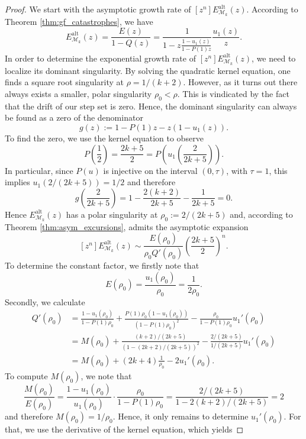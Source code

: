 \begin{proof}
  We start with the asymptotic growth rate of $[z^n]E_{\mathcal{M}_k}^\mathrm{alt}(z)$. 
  According to Theorem \ref{thm:gf_catastrophes}, we have 
  $$ 
    E_{\mathcal{M}_k}^\mathrm{alt}(z) = \frac{E(z)}{1 - Q(z)} = \frac{1}{1-z\frac{1-u_{1}(z)}{1-P(1)z}}\frac{u_{1}(z)}{z}.
  $$
  In order to determine the exponential growth rate of $[z^n]E_{\mathcal{M}_k}^\mathrm{alt}(z)$, we need to localize its dominant singularity.
  By solving the quadratic kernel equation, one finds a square root singularity  at $\rho = 1/(k+2)$.
  However, as it turns out there always exists a smaller, polar singularity $\rho_{0} < \rho$. This is vindicated by the fact that the drift of our step set is zero.
  Hence, the dominant singularity can always be found as a zero of the denominator 
  $$
    g(z) := 1-P(1)z - z(1-u_{1}(z)).
  $$
  To find the zero, we use the kernel equation to observe 
  $$
    P\left(\frac{1}{2}\right) = \frac{2k+5}{2} = P\left(u_{1}\left(\frac{2}{2k+5}\right)\right).
    $$
  In particular, since $P(u)$ is injective on the interval $(0,\tau)$, with $\tau = 1$, this implies $u_1(2/(2k+5)) = 1/2$ and therefore
  $$
    g\left(\frac{2}{2k+5}\right) = 1 - \frac{2(k+2)}{2k+5} - \frac{1}{2k+5} = 0.
  $$
  Hence $E_{\mathcal{M}_k}^\mathrm{alt}(z)$ has a polar singularity at $\rho_0 := 2/(2k+5)$ and, according to Theorem \ref{thm:asym_excursions}, admits the asymptotic expansion
  $$
    [z^n]E_{\mathcal{M}_k}^\mathrm{alt}(z) \sim \frac{E(\rho_0)}{\rho_0 Q'(\rho_0)} \left(\frac{2k+5}{2}\right)^n.
  $$
  To determine the constant factor, we firstly note that 
  $$
    E(\rho_0) = \frac{u_1(\rho_0)}{\rho_0} = \frac{1}{2\rho_0}.
  $$
  Secondly, we calculate
  \begin{align*}
    Q'(\rho_0) &= \frac{1 - u_1(\rho_0)}{1 - P(1)\rho_0} + \frac{P(1)\rho_0(1 - u_1(\rho_0))}{(1 - P(1)\rho_0)^2} - \frac{\rho_0 }{1 - P(1)\rho_0}u_1'(\rho_0) \\
    &= M(\rho_0) + \frac{(k+2)/(2k+5)}{(1 - (2k+2)/(2k+5))^2} - \frac{2/(2k+5)}{1/(2k+5)}u_1'(\rho_0) \\
    &= M(\rho_0) + (2k+4)\frac{1}{\rho_0} - 2 u_1'(\rho_0).
  \end{align*}
  To compute $M(\rho_0)$, we note that 
  $$
    \frac{M(\rho_0)}{E(\rho_0)} = 
    \frac{1 - u_1(\rho_0)}{u_1(\rho_0)} \cdot \frac{\rho_0}{1 - P(1) \rho_0}
    = \frac{2/(2k+5)}{1 - 2(k+2)/(2k+5)} = 2
  $$
  and therefore $M(\rho_0) = 1/\rho_0$.
  Hence, it only remains to determine $u_1'(\rho_0)$. For that, we use the derivative of the kernel equation, which yields

\end{proof}
